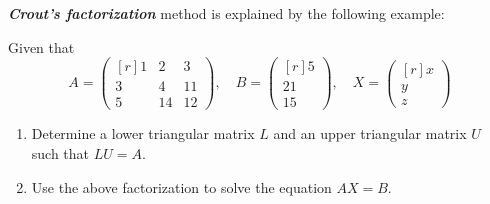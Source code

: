 \documentclass[12pt,class=book,crop=false]{standalone}
\begin{document}
\emph{\textbf{Crout's factorization}} method  is explained by the following example:
\begin{prob}
    Given that
    \[
        A=\begin{pmatrix*}[r]
            1&2&3\\
            3&4&11\\
            5&14&12
        \end{pmatrix*},\quad
        B=\begin{pmatrix*}[r]
            5\\
            21\\
            15
        \end{pmatrix*},\quad
        X=\begin{pmatrix*}[r]
            x\\
            y\\
            z
        \end{pmatrix*}
    \]
    \begin{enumerate}[label={(\roman*)}]
        \item Determine a lower triangular matrix $ L $ and an upper triangular matrix $ U $ such that $ L U = A $.
        \item Use the above factorization to solve the equation $ A X = B $.
    \end{enumerate}
\end{prob}
\end{document}
